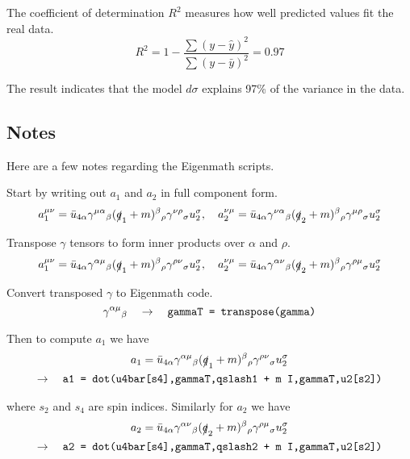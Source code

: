 \documentclass[12pt]{article}
\begin{document}
\noindent
The coefficient of determination $R^2$ measures how well predicted values fit the real data.
\begin{equation*}
R^2=1-\frac{\sum(y-\hat{y})^2}{\sum(y-\bar{y})^2}=0.97
\end{equation*}

\noindent
The result indicates that the model $d\sigma$ explains 97\% of the variance in the data.

\subsection*{Notes}
Here are a few notes regarding the Eigenmath scripts.

\bigskip
\noindent
Start by writing out $a_1$ and $a_2$ in full component form.
\begin{equation*}
a_1^{\mu\nu}
=\bar{u}_{4\alpha}\gamma^{\mu\alpha}{}_\beta(\slashed{q}_1+m)^\beta{}_\rho\gamma^{\nu\rho}{}_\sigma u_2^\sigma,
\quad
a_2^{\nu\mu}
=\bar{u}_{4\alpha}\gamma^{\nu\alpha}{}_\beta(\slashed{q}_2+m)^\beta{}_\rho\gamma^{\mu\rho}{}_\sigma u_2^\sigma
\end{equation*}

\noindent
Transpose $\gamma$ tensors to form inner products over $\alpha$ and $\rho$.
\begin{equation*}
a_1^{\mu\nu}
=\bar{u}_{4\alpha}\gamma^{\alpha\mu}{}_\beta(\slashed{q}_1+m)^\beta{}_\rho\gamma^{\rho\nu}{}_\sigma u_2^\sigma,
\quad
a_2^{\nu\mu}
=\bar{u}_{4\alpha}\gamma^{\alpha\nu}{}_\beta(\slashed{q}_2+m)^\beta{}_\rho\gamma^{\rho\mu}{}_\sigma u_2^\sigma
\end{equation*}

\noindent
Convert transposed $\gamma$ to Eigenmath code.
\begin{equation*}
\gamma^{\alpha\mu}{}_\beta
\quad\rightarrow\quad
\text{\tt gammaT = transpose(gamma)}
\end{equation*}

\noindent
Then to compute $a_1$ we have
\begin{multline*}
a_1=\bar{u}_{4\alpha}\gamma^{\alpha\mu}{}_\beta(\slashed{q}_1+m)^\beta{}_\rho\gamma^{\rho\nu}{}_\sigma u_2^\sigma
\\
\rightarrow\quad
\text{\tt a1 = dot(u4bar[s4],gammaT,qslash1 + m I,gammaT,u2[s2])}
\end{multline*}

\noindent
where $s_2$ and $s_4$ are spin indices.
Similarly for $a_2$ we have
\begin{multline*}
a_2=\bar{u}_{4\alpha}\gamma^{\alpha\nu}{}_\beta(\slashed{q}_2+m)^\beta{}_\rho\gamma^{\rho\mu}{}_\sigma u_2^\sigma
\\
\rightarrow\quad
\text{\tt a2 = dot(u4bar[s4],gammaT,qslash2 + m I,gammaT,u2[s2])}
\end{multline*}
\end{document}
